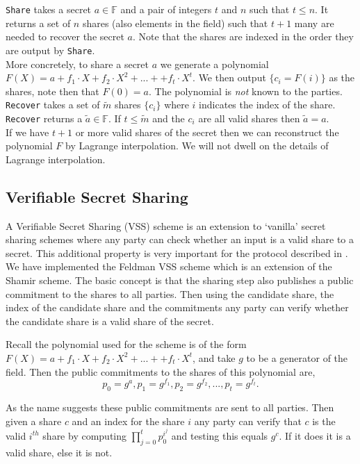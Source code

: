 \documentclass[ %
                    author={Nicholas Tutte},
                supervisor={Prof. Nigel Smart},
                    degree={MEng},
                     title={Secure Two Party Computation},
                  subtitle={A practical comparison of recent protocols},
                      type={Research - GG1K},
                      year={2015} ]{dissertation}
\begin{document}
\begin{appendices}
					\texttt{Share} takes a secret $a \in \mathbb{F}$ and a pair of integers $t$ and $n$ such that $t \leq n$. It returns a set of $n$ shares (also elements in the field) such that $t + 1$ many are needed to recover the secret $a$. Note that the shares are indexed in the order they are output by \texttt{Share}.\\

					More concretely, to share a secret $a$ we generate a polynomial $F(X) = a + f_1 \cdot X + f_2 \cdot X^2 + ... +  + f_t \cdot X ^ t$. We then output $\{c_i = F(i)\}$ as the shares, note then that $F(0) = a$. The polynomial is \emph{not} known to the parties.\\

					\texttt{Recover} takes a set of $\tilde m$ shares $\{c_i\}$ where $i$ indicates the index of the share. \texttt{Recover} returns a $ \tilde a \in \mathbb{F}$. If $t \leq \tilde m$ and the $c_i$ are all valid shares then $\tilde a = a$.\\

					If we have $t + 1$ or more valid shares of the secret then we can reconstruct the polynomial $F$ by Lagrange interpolation. We will not dwell on the details of Lagrange interpolation.\\

				\subsection{Verifiable Secret Sharing}

					A Verifiable Secret Sharing (VSS) scheme is an extension to `vanilla' secret sharing schemes where any party can check whether an input is a valid share to a secret. This additional property is very important for the protocol described in \cite{Katz_Symm_CnC_2013}.\\

					We have implemented the Feldman VSS scheme which is an extension of the Shamir scheme. The basic concept is that the sharing step also publishes a public commitment to the shares to all parties. Then using the candidate share, the index of the  candidate share and the commitments any party can verify whether the candidate share is a valid share of the secret.

					Recall the polynomial used for the scheme is of the form $F(X) = a + f_1 \cdot X + f_2 \cdot X^2 + ... +  + f_t \cdot X ^ t$, and take $g$ to be a generator of the field. Then the public commitments to the shares of this polynomial are,
					$$p_0 = g^a, p_1 = g^{f_1}, p_2 = g^{f_2}, ..., p_t = g^{f_t}.$$
					
					As the name suggests these public commitments are sent to all parties. Then given a share $c$ and an index for the share $i$ any party can verify that $c$ is the valid $i^{th}$ share by computing $\prod_{j=0}^{t} p_0 ^ {i ^ j}$ and testing this equals $g ^ c$. If it does it is a valid share, else it is not.
		
			
	\end{appendices}
\end{document}
